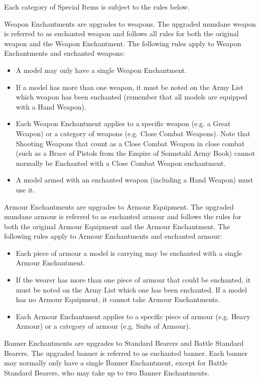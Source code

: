 Each category of Special Items is subject to the rules below.


Weapon Enchantments are upgrades to weapons. The upgraded mundane weapon is referred to as enchanted weapon and follows all rules for both the original weapon and the Weapon Enchantment. The following rules apply to Weapon Enchantments and enchanted weapons:
\begin{itemize}
\item A model may only have a single Weapon Enchantment.
\item If a model has more than one weapon, it must be noted on the Army List which weapon has been enchanted (remember that all models are equipped with a Hand Weapon).
\item Each Weapon Enchantment applies to a specific weapon (e.g. a Great Weapon) or a category of weapons (e.g. Close Combat Weapons). Note that Shooting Weapons that count as a Close Combat Weapon in close combat (such as a Brace of Pistols from the Empire of Sonnstahl Army Book) cannot normally be Enchanted with a Close Combat Weapon enchantment.
\item A model armed with an enchanted weapon (including a Hand Weapon) must use it.
\end{itemize}


Armour Enchantments are upgrades to Armour Equipment. The upgraded mundane armour is referred to as enchanted armour and follows the rules for both the original Armour Equipment and the Armour Enchantment. The following rules apply to Armour Enchantments and enchanted armour:
\begin{itemize}
\item Each piece of armour a model is carrying may be enchanted with a single Armour Enchantment.
\item If the wearer has more than one piece of armour that could be enchanted, it must be noted on the Army List which one has been enchanted. If a model has no Armour Equipment, it cannot take Armour Enchantments.
\item Each Armour Enchantment applies to a specific piece of armour (e.g. Heavy Armour) or a category of armour (e.g. Suits of Armour).
\end{itemize}


Banner Enchantments are upgrades to Standard Bearers and Battle Standard Bearers. The upgraded banner is referred to as enchanted banner. Each banner may normally only have a single Banner Enchantment, except for Battle Standard Bearers, who may take up to two Banner Enchantments.

